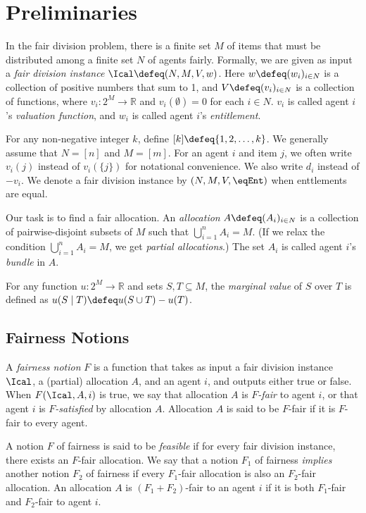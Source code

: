 \section{Preliminaries}
\label{sec:prelims}

In the fair division problem, there is a finite set $M$ of items
that must be distributed among a finite set $N$ of agents fairly.
Formally, we are given as input a \emph{fair division instance} $\Ical \defeq (N, M, V, w)$.
Here $w \defeq (w_i)_{i \in N}$ is a collection of positive numbers that sum to 1,
and $V \defeq (v_i)_{i \in N}$ is a collection of functions,
where $v_i: 2^M \to \mathbb{R}$ and $v_i(\emptyset) = 0$ for each $i \in N$.
$v_i$ is called agent $i$'s \emph{valuation function},
and $w_i$ is called agent $i$'s \emph{entitlement}.

For any non-negative integer $k$, define $[k] \defeq \{1, 2, \ldots, k\}$.
We generally assume \wLoG{} that $N = [n]$ and $M = [m]$.
For an agent $i$ and item $j$, we often write $v_i(j)$ instead of $v_i(\{j\})$ for notational convenience. We also write $d_i$ instead of $-v_i$.
We denote a fair division instance by $(N, M, V, \eqEnt)$
when enttlements are equal.

Our task is to find a fair allocation. An \emph{allocation} $A \defeq (A_i)_{i \in N}$ is
a collection of pairwise-disjoint subsets of $M$ such that $\bigcup_{i=1}^n A_i = M$.
(If we relax the condition $\bigcup_{i=1}^n A_i = M$, we get \emph{partial allocations}.)
The set $A_i$ is called agent $i$'s \emph{bundle} in $A$.

For any function $u: 2^M \to \mathbb{R}$ and sets $S, T \subseteq M$, the \emph{marginal value}
of $S$ over $T$ is defined as $u(S \mid T) \defeq u(S \cup T) - u(T)$.

\subsection{Fairness Notions}
\label{sec:prelims:fairness-notions}

A \emph{fairness notion} $F$ is a function that takes as input a fair division instance $\Ical$,
a (partial) allocation $A$, and an agent $i$, and outputs either true or false.
When $F(\Ical, A, i)$ is true, we say that allocation $A$ is $F$\emph{-fair} to agent $i$,
or that agent $i$ is $F$\emph{-satisfied} by allocation $A$.
Allocation $A$ is said to be $F$-fair if it is $F$-fair to every agent.

A notion $F$ of fairness is said to be \emph{feasible} if for every fair division instance,
there exists an $F$-fair allocation.
We say that a notion $F_1$ of fairness \emph{implies} another notion $F_2$ of fairness if
every $F_1$-fair allocation is also an $F_2$-fair allocation.
An allocation $A$ is $(F_1+F_2)$-fair to an agent $i$ if it is both $F_1$-fair
and $F_2$-fair to agent $i$.

